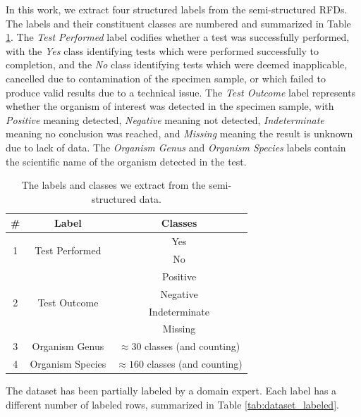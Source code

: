 \documentclass[sigconf]{acmart}
\begin{document}
In this work, we extract four structured labels from the semi-structured RFDs. The labels and their constituent classes are numbered and summarized in Table \ref{tab:labels_and_classes}. The \textit{Test Performed} label codifies whether a test was successfully performed, with the \textit{Yes} class identifying tests which were performed successfully to completion, and the \textit{No} class identifying tests which were deemed inapplicable, cancelled due to contamination of the specimen sample, or which failed to produce valid results due to a technical issue. The \textit{Test Outcome} label represents whether the organism of interest was detected in the specimen sample, with \textit{Positive} meaning detected, \textit{Negative} meaning not detected, \textit{Indeterminate} meaning no conclusion was reached, and \textit{Missing} meaning the result is unknown due to lack of data. The \textit{Organism Genus} and \textit{Organism Species} labels contain the scientific name of the organism detected in the test.

\begin{table}
    \caption{The labels and classes we extract from the semi-structured data.}
    \label{tab:labels_and_classes}
    
    \begin{tabular}{ccc}
        \toprule
        \# & Label & Classes \\
        \toprule
        \multirow{2}{*}{1} & \multirow{2}{*}{Test Performed} & Yes \\
                           &                                 & No \\
        \midrule
        \multirow{4}{*}{2} & \multirow{4}{*}{Test Outcome} & Positive \\
                           &                               & Negative \\
                           &                               & Indeterminate \\
                           &                               & Missing \\
        \midrule
        3 & Organism Genus & $\approx 30$ classes (and counting) \\
        \midrule
        4 & Organism Species & $\approx 160$ classes (and counting) \\
        \bottomrule
    \end{tabular}
\end{table}

The dataset has been partially labeled by a domain expert. Each label has a different number of labeled rows, summarized in Table \ref{tab:dataset_labeled}.
\end{document}
